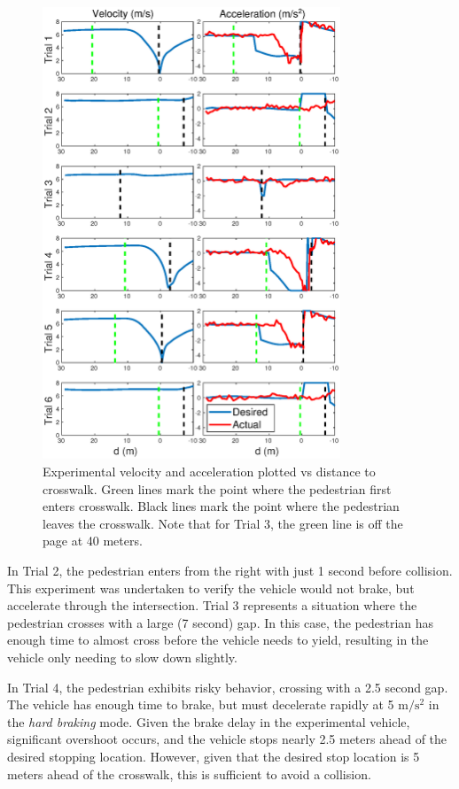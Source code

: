 \documentclass[letterpaper, 10 pt, conference]{ieeeconf} %
\begin{document}
\begin{figure}[h]
\centering
\includegraphics[width=3.5in]{figures/expPlot.eps}
\caption{Experimental velocity and acceleration plotted vs distance to crosswalk. Green lines mark the point where the pedestrian first enters crosswalk. Black lines mark the point where the pedestrian leaves the crosswalk. Note that for Trial 3, the green line is off the page at 40 meters.}
\label{fig:expPlot}
\end{figure}

In Trial 2, the pedestrian enters from the right with just 1 second before collision. This experiment was undertaken to verify the vehicle would not brake, but accelerate through the intersection. Trial 3 represents a situation where the pedestrian crosses with a large (7 second) gap. In this case, the pedestrian has enough time to almost cross before the vehicle needs to yield, resulting in the vehicle only needing to slow down slightly. 

In Trial 4, the pedestrian exhibits risky behavior, crossing with a 2.5 second gap. The vehicle has enough time to brake, but must decelerate rapidly at 5 $\mathrm{m/s^2}$ in the \textit{hard braking} mode. Given the brake delay in the experimental vehicle, significant overshoot occurs, and the vehicle stops nearly 2.5 meters ahead of the desired stopping location. However, given that the desired stop location is 5 meters ahead of the crosswalk, this is sufficient to avoid a collision.
\end{document}
